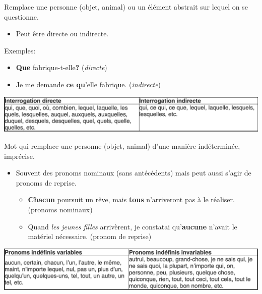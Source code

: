 \documentclass[10pt, french]{article}
\begin{document}
\begin{multicols*}{2}
\begin{definitionNOHFILLsub}
Remplace une personne (objet, animal) ou un élément abstrait sur lequel on se questionne.
\begin{itemize}
	\item	Peut être directe ou indirecte.
\end{itemize}

\tcbline

Exemples:
\begin{itemize}
	\item	\textbf{Que} fabrique-t-elle\textbf{?} (\textit{directe})
	\item	Je me demande \textbf{ce qu}'elle fabrique. (\textit{indirecte})
\end{itemize}
\begin{center}
	\includegraphics[width=0.9\columnwidth]{pronom-interg}
\end{center}
\end{definitionNOHFILLsub}

\begin{definitionNOHFILLsub}
Mot qui remplace une personne (objet, animal) d'une manière indéterminée, imprécise.

\tcbline

\begin{itemize}
	\item	Souvent des pronoms nominaux (sans antécédents) mais peut aussi s'agir de pronoms de reprise.
		\begin{itemize}
		\item	\textbf{Chacun} poursuit un rêve, mais \textbf{tous} n'arriveront pas à le réaliser. (pronoms nominaux)
		\item	Quand \textit{les jeunes filles} arrivèrent, je constatai qu'\textbf{aucune} n'avait le matériel nécessaire. (pronom de reprise)
		\end{itemize}
\end{itemize}

\begin{center}
	\includegraphics[width=0.9\columnwidth]{pronom-indef}
\end{center}
\end{definitionNOHFILLsub}


\end{multicols*}
\end{document}
